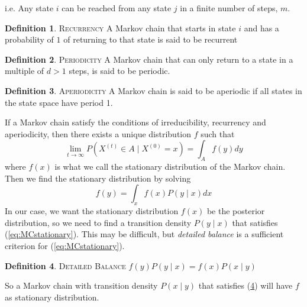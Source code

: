 \documentclass{article}
\theoremstyle{definition}
\newtheorem{definition}{Definition}[section]
\begin{document}
i.e. Any state $i$ can be reached from any state $j$ in a finite number of steps, $m$.
\theoremstyle{definition}
\begin{definition}{\textsc{Recurrency}} 
A Markov chain that starts in state $i$ and has a probability of $1$ of returning to that state is said to be recurrent 
\end{definition}
\begin{definition}{\textsc{Periodicity}} 
A Markov chain that can only return to a state in a multiple of $d>1$ steps, is said to be periodic. 
\end{definition}
\theoremstyle{definition}
\begin{definition}{\textsc{Aperiodicity}}
A Markov chain is said to be aperiodic if all states in the state space have period 1. 
\end{definition}
If a Markov chain satisfy the conditions of irreducibility, recurrency and aperiodicity, then there exists a unique  distribution $f$ such that
\begin{equation*}
\lim_{t\xrightarrow{}\infty}P\left(X^{(t)}\in A\mid X^{(0)} = x\right) = \int_{A} f\left(y\right) dy
\end{equation*}
where $f\left(x\right)$ is what we call the stationary distribution of the Markov chain. Then we find the stationary distribution by solving 
\begin{equation}\label{eq:MCstationary}
    f(y) = \int_x f(x) P(y\mid x) dx 
\end{equation}In our case, we want the stationary distribution $f(x)$ be the posterior distribution, so we need to find a transition density  $P\left(y\mid x\right)$ that satisfies (\ref{eq:MCstationary}). This may be difficult, but \textit{detailed balance} is a sufficient criterion for (\ref{eq:MCstationary}). 
\theoremstyle{definition}
\begin{definition}{\textsc{Detailed Balance}} \label{def:detailed_balance}
   $ f(y)P\left(y\mid x\right) = f(x)P\left(x\mid y\right)$
\end{definition}
So a Markov chain with transition density $P\left(x\mid y\right)$ that satisfies (\ref{def:detailed_balance}) will have $f$ as stationary distribution. 
\end{document}
